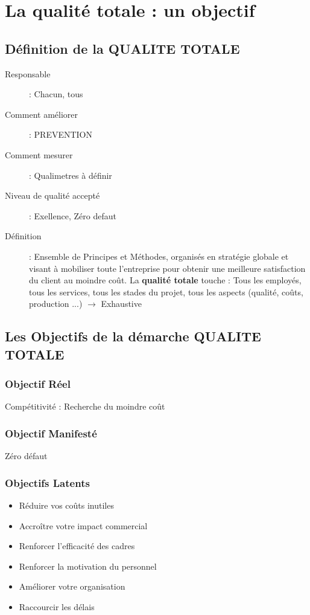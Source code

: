 \chapter{La qualité totale : un objectif}

\section{Définition de la QUALITE TOTALE}

\begin{description}
\item[Responsable] : Chacun, tous
\item[Comment améliorer] : PREVENTION
\item[Comment mesurer] : Qualimetres à définir
\item[Niveau de qualité accepté] : Exellence, Zéro defaut
\item[Définition] : Ensemble de Principes et Méthodes, organisés en stratégie globale et visant à mobiliser toute l’entreprise pour obtenir une meilleure satisfaction du client au moindre coût. La \textbf{qualité totale} touche : Tous les employés, tous les services, tous les stades du projet, tous les aspects (qualité, coûts, production ...) $\rightarrow$ Exhaustive
\end{description}

\section{Les Objectifs de la démarche QUALITE TOTALE}

	\subsection{Objectif Réel}
Compétitivité : Recherche du moindre coût

	\subsection{Objectif Manifesté}
Zéro défaut

	\subsection{Objectifs Latents}
	\begin{itemize}
	\item Réduire vos coûts inutiles
	\item Accroître votre impact commercial
	\item Renforcer l'efficacité des cadres
	\item Renforcer la motivation du personnel
	\item Améliorer votre organisation 
	\item Raccourcir les délais
	\end{itemize}

